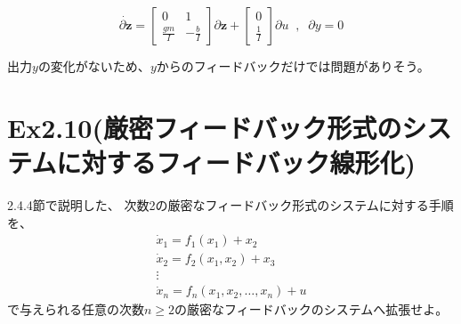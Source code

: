 \documentclass{jsarticle}
\begin{document}
\begin{equation}
  \dot{\partial \bm{z}} = 
  \left[
    \begin{array}{ccc}
      0 & 1 \\
      \frac{gm}{I} & -\frac{b}{I} 
    \end{array}
    \right]
    \partial \bm{z} + 
    \left[
    \begin{array}{c}
      0\\
      \frac{1}{I}
    \end{array}
    \right]
    \partial u 
    \;\;,\;\;
    \partial y = 0
\end{equation}

出力$y$の変化がないため、$y$からのフィードバックだけでは問題がありそう。

\newpage

\section*{Ex2.10(厳密フィードバック形式のシステムに対するフィードバック線形化)}

2.4.4節で説明した、
次数2の厳密なフィードバック形式のシステムに対する手順を、 
\begin{equation}
  \begin{array}{c}
    \dot{x}_1 = f_1(x_1) + x_2\\
    \dot{x}_2 = f_2(x_1,x_2) +x_3\\
    \vdots\\
    \dot{x}_n = f_n(x_1,x_2,\dots,x_n)+u
  \end{array}
\end{equation}
で与えられる任意の次数$n \geq 2$の厳密なフィードバックのシステムへ拡張せよ。
\;\\
\end{document}
